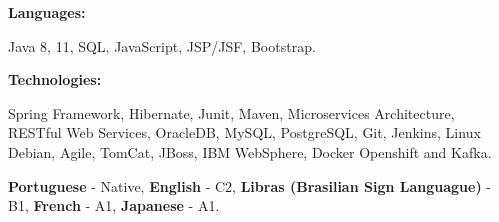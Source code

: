 \documentclass[9pt]{developercv} %
\begin{document}
\hfill %
\begin{minipage}[t]{0.465\textwidth}
    \vspace{-6pt}
    
    \begin{minipage}[t]{0.2\textwidth}
        \textbf{Languages:}
    \end{minipage}
    \hfill
    \begin{minipage}[t]{0.73\textwidth}
      Java 8, 11, SQL, JavaScript, JSP/JSF, Bootstrap.  
    \end{minipage}
    \vspace{4mm}
    
    \begin{minipage}[t]{0.2\textwidth}
        \textbf{Technologies:}
    \end{minipage}
    \hfill
    \begin{minipage}[t]{0.73\textwidth}
      Spring Framework, Hibernate, Junit, Maven, Microservices Architecture, RESTful Web Services, OracleDB, MySQL, PostgreSQL, Git, Jenkins, Linux Debian, Agile, TomCat, JBoss, IBM WebSphere, Docker Openshift and Kafka.
    \end{minipage}
    
\end{minipage}
\vspace{0.5 pt}
    \vspace{-6pt}
    \begin{center} \textbf{Portuguese} - Native, \textbf{English} - C2, \textbf{Libras (Brasilian Sign Languague)} - B1, \textbf{French} - A1, \textbf{Japanese} - A1. \end{center}
\vspace{0.5 pt}
\end{document}
